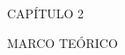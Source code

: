 \newpage
\thispagestyle{empty}
\vspace*{\fill}
\begingroup
\centering
\begin{flushright}{\fontsize{50}{60}\selectfont CAPÍTULO 2}\end{flushright}
\vspace{10 mm}
\begin{flushright}{\fontsize{30}{40}\selectfont MARCO TEÓRICO }\end{flushright}
\endgroup
\vspace*{\fill}
\newpage